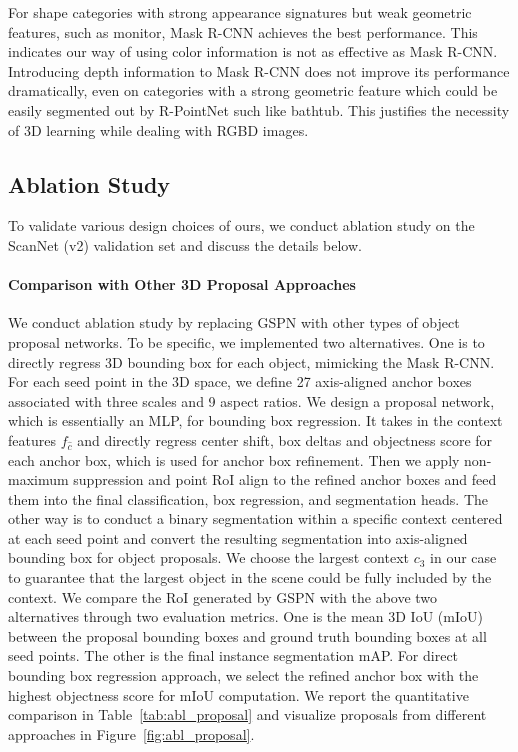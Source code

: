 \documentclass[10pt,twocolumn,letterpaper]{article}
\begin{document}
For shape categories with strong appearance signatures but weak geometric features, such as monitor, Mask R-CNN achieves the best performance. This indicates our way of using color information is not as effective as Mask R-CNN. Introducing depth information to Mask R-CNN does not improve its performance dramatically, even on categories with a strong geometric feature which could be easily segmented out by R-PointNet such like bathtub. This justifies the necessity of 3D learning while dealing with RGBD images.





\subsection{Ablation Study}
\label{sec:ablation_study}
To validate various design choices of ours, we conduct ablation study on the ScanNet (v2) validation set and discuss the details below.

\vspace{-\baselineskip}
\paragraph{Comparison with Other 3D Proposal Approaches}
We conduct ablation study by replacing GSPN with other types of object proposal networks. To be specific, we implemented two alternatives. One is to directly regress 3D bounding box for each object, mimicking the Mask R-CNN. For each seed point in the 3D space, we define 27 axis-aligned anchor boxes associated with three scales and 9 aspect ratios. We design a proposal network, which is essentially an MLP, for bounding box regression. It takes in the context features $f_{\hat{c}}$ and directly regress center shift, box deltas and objectness score for each anchor box, which is used for anchor box refinement. Then we apply non-maximum suppression and point RoI align to the refined anchor boxes and feed them into the final classification, box regression, and segmentation heads. The other way is to conduct a binary segmentation within a specific context centered at each seed point and convert the resulting segmentation into axis-aligned bounding box for object proposals. We choose the largest context $c_3$ in our case to guarantee that the largest object in the scene could be fully included by the context. We compare the RoI generated by GSPN with the above two alternatives through two evaluation metrics. One is the mean 3D IoU (mIoU) between the proposal bounding boxes and ground truth bounding boxes at all seed points. The other is the final instance segmentation mAP. For direct bounding box regression approach, we select the refined anchor box with the highest objectness score for mIoU computation. We report the quantitative comparison in Table~\ref{tab:abl_proposal} and visualize proposals from different approaches in Figure~\ref{fig:abl_proposal}.
\end{document}
